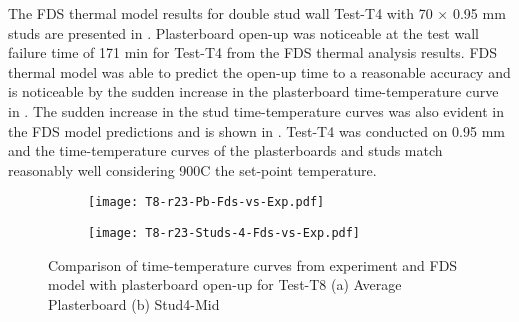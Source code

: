 The FDS thermal model results for double stud wall Test-T4 with 70 $\times$ 0.95 mm studs are presented in . Plasterboard open-up was noticeable at the test wall failure time of 171 min for Test-T4 from the FDS thermal analysis results. FDS thermal model was able to predict the open-up time to a reasonable accuracy and is noticeable by the sudden increase in the plasterboard time-temperature curve in . The sudden increase in the stud time-temperature curves was also evident in the FDS model predictions and is shown in . Test-T4 was conducted on 0.95 mm and the time-temperature curves of the plasterboards and  studs match reasonably well considering 900\degree C the set-point temperature.
\begin{figure}[!htbp]
	\centering
	\begin{subfigure}[b]{0.7\textwidth}
		\centering
		\texttt{[image: T8-r23-Pb-Fds-vs-Exp.pdf]}
		\caption{}
		\label{subfig:T8-r23-Pb-Fds-vs-Exp}
	\end{subfigure}
	\begin{subfigure}[b]{0.6\textwidth}
		\centering
		\texttt{[image: T8-r23-Studs-4-Fds-vs-Exp.pdf]}
		\caption{}
		\label{subfig:T8-r23-Studs-4-Fds-vs-Exp}
	\end{subfigure}
	   \caption{Comparison of time-temperature curves from experiment and FDS model with plasterboard open-up for Test-T8 (a) Average Plasterboard (b) Stud4-Mid}
	   \label{fig:T8-fds-output-pbop}
\end{figure}

